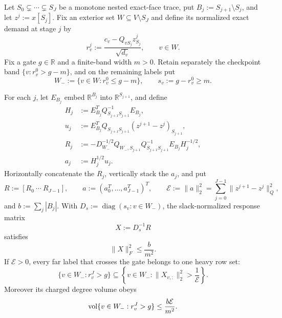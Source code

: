 \begin{theorem}
\label{thm:slack-normalized-partial-gate-packing}
Let
$S_0\subsetneq\cdots\subsetneq S_J$ be a monotone nested exact-face trace,
put $B_j:=S_{j+1}\setminus S_j$, and let
$z^j:=x[S_j]$.  Fix an exterior set $W\subseteq V\setminus S_J$ and define
its normalized exact demand at stage $j$ by
\begin{equation*}
 r_v^j:=\frac{c_v-Q_{vS_j}z^j_{S_j}}{\sqrt{d_v}},
 \qquad v\in W.
\end{equation*}
Fix a gate $g\in\mathbb R$ and a finite-band width $m>0$.  Retain separately
the checkpoint band $\{v:r_v^0>g-m\}$, and on the remaining labels put
\begin{equation*}
 W_-:=\{v\in W:r_v^0\leq g-m\},
 \qquad s_v:=g-r_v^0\geq m.
\end{equation*}

For each $j$, let $E_{B_j}$ embed $\mathbb R^{B_j}$ into
$\mathbb R^{S_{j+1}}$, and define
\begin{align*}
 H_j&:=E_{B_j}^TQ_{S_{j+1}S_{j+1}}^{-1}E_{B_j},\\
 u_j&:=E_{B_j}^TQ_{S_{j+1}S_{j+1}}
               (z^{j+1}-z^j)_{S_{j+1}},\\
 R_j&:=-D_{W_-}^{-1/2}Q_{W_-,S_{j+1}}
       Q_{S_{j+1}S_{j+1}}^{-1}E_{B_j}H_j^{-1/2},\\
 a_j&:=H_j^{1/2}u_j.
\end{align*}
Horizontally concatenate the $R_j$, vertically stack the $a_j$, and put
\begin{equation}
 R:=[R_0\ \cdots\ R_{J-1}],
 \qquad
 a:=(a_0^T,\ldots,a_{J-1}^T)^T,
 \qquad
 \mathcal E:=\|a\|_2^2
 =\sum_{j=0}^{J-1}\|z^{j+1}-z^j\|_Q^2,
 \label{eq:slack-packed-response-factor}
\end{equation}
and $b:=\sum_j|B_j|$.  With
$D_s:=\operatorname{diag}(s_v:v\in W_-)$, the slack-normalized response
matrix
\begin{equation*}
 X:=D_s^{-1}R
\end{equation*}
satisfies
\begin{equation}
 \|X\|_F^2\leq\frac{b}{m^2}.
 \label{eq:slack-packed-mass}
\end{equation}
If $\mathcal E>0$, every far label that crosses the gate belongs to one heavy
row set:
\begin{equation}
 \{v\in W_-:r_v^J>g\}
 \subseteq
 \left\{v\in W_-:\|X_{v,:}\|_2^2>\frac1{\mathcal E}\right\}.
 \label{eq:slack-crossing-heavy-containment}
\end{equation}
Moreover its charged degree volume obeys
\begin{equation}
 \operatorname{vol}\{v\in W_-:r_v^J>g\}
 \leq\frac{b\mathcal E}{m^2}.
 \label{eq:slack-crossing-volume}
\end{equation}


\end{theorem}
